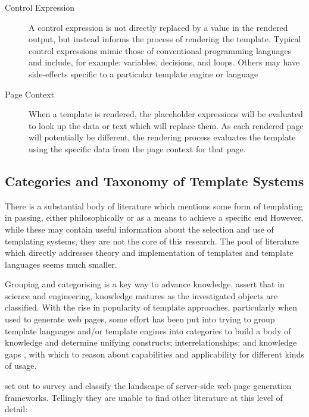 \begin{description}
\item[Control Expression] 

A control expression is not directly replaced by a value in the rendered output, but instead informs the process of rendering the template. Typical control expressions mimic those of conventional programming languages and include, for example: variables, decisions, and loops. Others may have side-effects specific to a particular template engine or language

\item[Page Context] 

When a template is rendered, the placeholder expressions will be evaluated to look up the data or text which will replace them. As each rendered page will potentially be different, the rendering process evaluates the template using the specific data from the page context for that page.

\end{description}

\subsection{Categories and Taxonomy of Template Systems}

There is a substantial body of literature which mentions some form of templating in passing, either philosophically \citep{Bush1945} \citep{Nelson1974} or as a means to achieve a specific end \citep{Caldwell1998} However, while these may contain useful information about the selection and use of templating systems, they are not the core of this research. The pool of literature which directly addresses theory and implementation of templates and template languages seems much smaller.

Grouping and categorising is a key way to advance knowledge. \cite{Vegas2009} assert that in science and engineering, knowledge matures as the investigated objects are classified. With the rise in popularity of template approaches, particularly when used to generate web pages, some effort has been put into trying to group template languages and/or template engines into categories to build a body of knowledge and determine unifying constructs; interrelationships; and knowledge gaps \citep{Vegas2009}, with which to reason about capabilities and applicability for different kinds of usage.

\cite{Vosloo2008} set out to survey and classify the landscape of server-side web page generation frameworks. Tellingly they are unable to find other literature at this level of detail:

